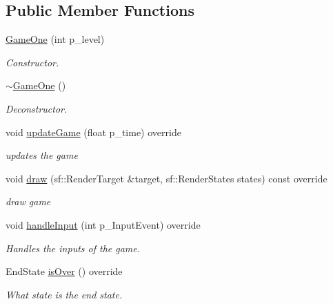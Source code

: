 \subsection*{Public Member Functions}
\begin{DoxyCompactItemize}
\item 
\mbox{\label{class_game_one_aa7870529dfdb7ed178dbf2fc00a80f1e}} 
\mbox{\hyperlink{class_game_one_aa7870529dfdb7ed178dbf2fc00a80f1e}{Game\+One}} (int p\+\_\+level)
\begin{DoxyCompactList}\small\item\em Constructor. \end{DoxyCompactList}\item 
\mbox{\hyperlink{class_game_one_a216b9c400f6e70b7fb6814e8b96d1cc9}{$\sim$\+Game\+One}} ()
\begin{DoxyCompactList}\small\item\em Deconstructor. \end{DoxyCompactList}\item 
\mbox{\label{class_game_one_abb235d1a7d7415707bf07389e91f6296}} 
void \mbox{\hyperlink{class_game_one_abb235d1a7d7415707bf07389e91f6296}{update\+Game}} (float p\+\_\+time) override
\begin{DoxyCompactList}\small\item\em updates the game \end{DoxyCompactList}\item 
\mbox{\label{class_game_one_af4df2785640103b623be240fa8be1e8a}} 
void \mbox{\hyperlink{class_game_one_af4df2785640103b623be240fa8be1e8a}{draw}} (sf\+::\+Render\+Target \&target, sf\+::\+Render\+States states) const override
\begin{DoxyCompactList}\small\item\em draw game \end{DoxyCompactList}\item 
void \mbox{\hyperlink{class_game_one_ae1ecd54039b4a3650f0d113ef4629da3}{handle\+Input}} (int p\+\_\+\+Input\+Event) override
\begin{DoxyCompactList}\small\item\em Handles the inputs of the game. \end{DoxyCompactList}\item 
End\+State \mbox{\hyperlink{class_game_one_a9e9050de230336fac769ab5e8b23f7f8}{is\+Over}} () override
\begin{DoxyCompactList}\small\item\em What state is the end state. \end{DoxyCompactList}\item 

\end{DoxyCompactItemize}
